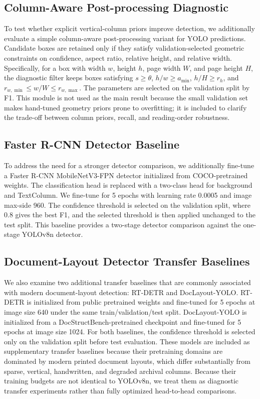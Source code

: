 \documentclass[12pt]{article}
\begin{document}
\subsection{Column-Aware Post-processing Diagnostic}
To test whether explicit vertical-column priors improve detection, we additionally evaluate a simple column-aware post-processing variant for YOLO predictions. Candidate boxes are retained only if they satisfy validation-selected geometric constraints on confidence, aspect ratio, relative height, and relative width. Specifically, for a box with width $w$, height $h$, page width $W$, and page height $H$, the diagnostic filter keeps boxes satisfying $s\geq\theta$, $h/w\geq a_{\min}$, $h/H\geq r_h$, and $r_{w,\min}\leq w/W\leq r_{w,\max}$. The parameters are selected on the validation split by F1. This module is not used as the main result because the small validation set makes hand-tuned geometry priors prone to overfitting; it is included to clarify the trade-off between column priors, recall, and reading-order robustness.

\subsection{Faster R-CNN Detector Baseline}
To address the need for a stronger detector comparison, we additionally fine-tune a Faster R-CNN MobileNetV3-FPN detector initialized from COCO-pretrained weights. The classification head is replaced with a two-class head for background and TextColumn. We fine-tune for 5 epochs with learning rate 0.0005 and image max-side 960. The confidence threshold is selected on the validation split, where 0.8 gives the best F1, and the selected threshold is then applied unchanged to the test split. This baseline provides a two-stage detector comparison against the one-stage YOLOv8n detector.

\subsection{Document-Layout Detector Transfer Baselines}
We also examine two additional transfer baselines that are commonly associated with modern document-layout detection: RT-DETR and DocLayout-YOLO. RT-DETR is initialized from public pretrained weights and fine-tuned for 5 epochs at image size 640 under the same train/validation/test split. DocLayout-YOLO is initialized from a DocStructBench-pretrained checkpoint and fine-tuned for 5 epochs at image size 1024. For both baselines, the confidence threshold is selected only on the validation split before test evaluation. These models are included as supplementary transfer baselines because their pretraining domains are dominated by modern printed document layouts, which differ substantially from sparse, vertical, handwritten, and degraded archival columns. Because their training budgets are not identical to YOLOv8n, we treat them as diagnostic transfer experiments rather than fully optimized head-to-head comparisons.
\end{document}
